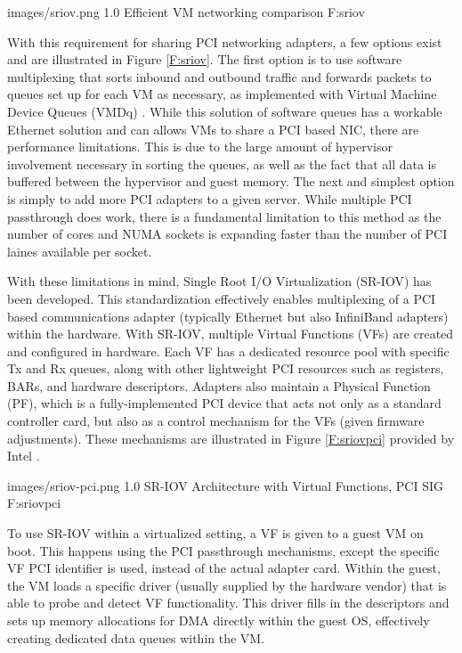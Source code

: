   {images/sriov.png}
  {1.0}
  {Efficient VM networking comparison \cite{Musleh2014cloud}}
  {F:sriov}


With this requirement for sharing PCI networking adapters, a few options exist and are illustrated in Figure \ref{F:sriov}. The first option is to use software multiplexing that sorts inbound and outbound traffic and forwards packets to queues set up for each VM as necessary, as implemented with Virtual Machine Device Queues (VMDq) \cite{luo2010network}. While this solution of software queues has a workable Ethernet solution and can allows VMs to share a PCI based NIC, there are performance limitations. This is due to the large amount of hypervisor involvement necessary in sorting the queues, as well as the fact that all data is buffered between the hypervisor and guest memory. The next and simplest option is simply to add more PCI adapters to a given server. While multiple PCI passthrough does work, there is a fundamental limitation to this method as the number of cores and NUMA sockets is expanding faster than the number of PCI laines available per socket. 

With these limitations in mind, Single Root I/O Virtualization (SR-IOV) has been developed. This standardization effectively enables multiplexing of a PCI based communications adapter (typically Ethernet but also InfiniBand adapters) within the hardware.  With SR-IOV, multiple Virtual Functions (VFs) are created and configured in hardware.  Each VF has a dedicated resource pool with specific Tx and Rx queues, along with other lightweight PCI resources such as registers, BARs, and hardware descriptors.  Adapters also maintain a Physical Function (PF), which is a fully-implemented PCI device that acts not only as a standard controller card, but also as a control mechanism for the VFs (given firmware adjustments). These mechanisms are illustrated in Figure \ref{F:sriovpci} provided by Intel \cite{kutch2011pci}. 
 
  {images/sriov-pci.png}
  {1.0}
  {SR-IOV Architecture with Virtual Functions, PCI SIG \cite{kutch2011pci}}
  {F:sriovpci}

To use SR-IOV within a virtualized setting, a VF is given to a guest VM on boot. This happens using the PCI passthrough mechanisms, except the specific VF PCI identifier is used, instead of the actual adapter card. Within the guest, the VM loads a specific driver (usually supplied by the hardware vendor) that is able to probe and detect VF functionality. This driver fills in the descriptors and sets up memory allocations for DMA directly within the guest OS, effectively creating dedicated data queues within the VM.  

